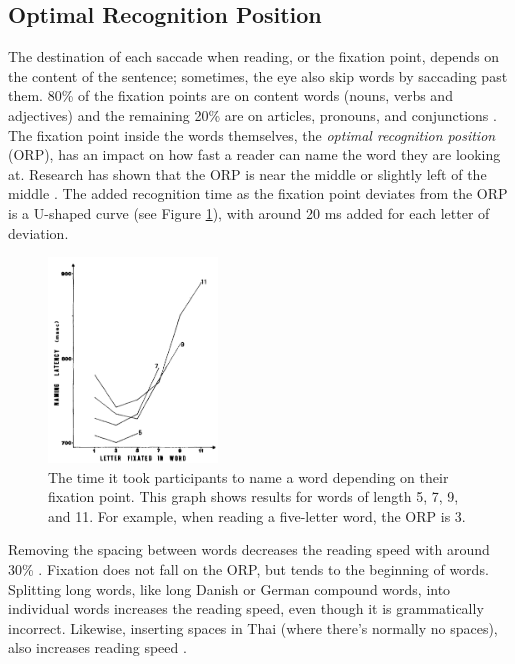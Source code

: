 \subsection{Optimal Recognition Position} \label{ORP}
The destination of each saccade when reading, or the fixation point, depends on the content of the sentence; sometimes, the eye also skip words by saccading past them. 80\% of the fixation points are on content words (nouns, verbs and adjectives) and the remaining 20\% are on articles, pronouns, and conjunctions \cite{eysenck_cognitive_2010}. The fixation point inside the words themselves, the \textit{optimal recognition position} (ORP), has an impact on how fast a reader can name the word they are looking at. Research has shown that the ORP is near the middle or slightly left of the middle \cite{oregan_optimal_1992, nazir_letter_1998, oregan_convenient_1984}. The added recognition time as the fixation point deviates from the ORP is a U-shaped curve (see Figure \ref{fig:ucurve}), with around 20 ms added for each letter of deviation.

\begin{figure}[htbp]
\centering
\includegraphics[width=0.4\textwidth]{Pics/ucurve}
\caption{The time it took participants to name a word depending on their fixation point. This graph shows results for words of length 5, 7, 9, and 11. For example, when reading a five-letter word, the ORP is 3. \protect\cite{oregan_convenient_1984}}
\label{fig:ucurve}
\end{figure}

Removing the spacing between words decreases the reading speed with around 30\% \cite{eyeMovement}. Fixation does not fall on the ORP, but tends to the beginning of words. Splitting long words, like long Danish or German compound words, into individual words increases the reading speed, even though it is grammatically incorrect. Likewise, inserting spaces in Thai (where there's normally no spaces), also increases reading speed 	\cite{eyeMovement}.